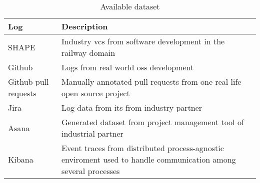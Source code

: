 \begin{table}[h]
\centering
\caption{Available dataset}
\label{tab:dataset}
\begin{tabular}{@{}lp{11cm}@{}}
\textbf{Log} & \textbf{Description} \\ \midrule
SHAPE & Industry \gls{vcs} from software development in the railway domain \\
Github & Logs from real world \gls{oss} development \\
Github pull requests & Manually annotated pull requests from one real life open source project \\
Jira & Log data from \gls{its} from industry partner \\
Asana & Generated dataset from project management tool of industrial partner \\
Kibana & Event traces from distributed process-agnostic enviroment used to handle communication among several processes \\ \bottomrule
\end{tabular}
\end{table}